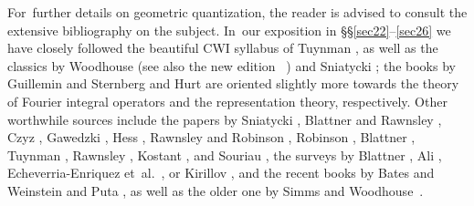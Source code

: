 \documentclass[12pt]{amsart}
\numberwithin{equation}{section}
\theoremstyle{remark}
\begin{document}
For~further details on geometric quantization, the reader is advised to consult
the extensive bibliography on the subject. In~our exposition in
\S\S\ref{sec22}--\ref{sec26} we
have closely followed the beautiful CWI syllabus of Tuynman \cite{bib:TuyCWI},
as well as the classics by Woodhouse \cite{bib:WoodhOLD} (see also the new
edition~ \cite{bib:Woodh}) and Sniatycki \cite{bib:SniaB}; the books by
Guillemin and Sternberg \cite{bib:GuiSt} and Hurt \cite{bib:Hurt} are oriented
slightly more towards the theory of Fourier integral operators and the
representation theory, respectively. Other worthwhile sources include the
papers by Sniatycki \cite{bib:SniaA}, Blattner and Rawnsley \cite{bib:BlatRaw}
\cite{bib:BlattRaCo}, Czyz \cite{bib:Czyz}, Gawedzki \cite{bib:GaweD}, Hess
\cite{bib:Hess}, Rawnsley and Robinson \cite{bib:RawnRob}, Robinson
\cite{bib:RobiTAMS}, Blattner \cite{bib:BlattPSPM} \cite{bib:BlattGSPM}
\cite{bib:BlattLN}, Tuynman \cite{bib:TuyWis} \cite{bib:TuyIrr}
\cite{bib:TuyGBK} \cite{bib:TuyCm}, Rawnsley \cite{bib:RawnCMP},
Kostant\cite{bib:KostSymp} \cite{bib:KostOno} \cite{bib:Kost}, and Souriau
\cite{bib:SouSD}, the surveys by Blattner \cite{bib:Blatt}, Ali
\cite{bib:AliSurv}, Echeverria-Enriquez et~al.~\cite{bib:EEMLRRVM}, or Kirillov
\cite{bib:KiriEMS}, and the recent books by Bates and Weinstein
\cite{bib:BaWei} and Puta \cite{bib:Puta}, as well as the older one by Simms
and Woodhouse~\cite{bib:SimWo}.
\end{document}
